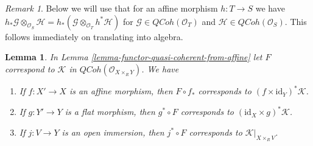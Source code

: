 \documentclass{stacks-project}
\theoremstyle{plain}
\newtheorem{lemma}[subsection]{Lemma}
\theoremstyle{definition}
\theoremstyle{remark}
\newtheorem{remark}[subsection]{Remark}
\numberwithin{equation}{subsection}
\def\QCoh{\mathit{QCoh}}
\begin{document}
\begin{remark}
\label{remark-affine-morphism}
Below we will use that for an affine morphism
$h : T \to S$ we have $h_*\mathcal{G} \otimes_{\mathcal{O}_S} \mathcal{H} =
h_*(\mathcal{G} \otimes_{\mathcal{O}_T} h^*\mathcal{H})$ for
$\mathcal{G} \in \QCoh(\mathcal{O}_T)$ and
$\mathcal{H} \in \QCoh(\mathcal{O}_S)$. This follows
immediately on translating into algebra.
\end{remark}

\begin{lemma}
\label{lemma-functor-quasi-coherent-from-affine-compose}
In Lemma \ref{lemma-functor-quasi-coherent-from-affine} let $F$
correspond to $\mathcal{K}$ in $\QCoh(\mathcal{O}_{X \times_R Y})$.
We have
\begin{enumerate}
\item If $f : X' \to X$ is an affine morphism, then $F \circ f_*$
corresponds to $(f \times \text{id}_Y)^*\mathcal{K}$.
\item If $g : Y' \to Y$ is a flat morphism, then $g^* \circ F$ corresponds to
$(\text{id}_X \times g)^*\mathcal{K}$.
\item If $j : V \to Y$ is an open immersion, then $j^* \circ F$
corresponds to $\mathcal{K}|_{X \times_R V}$.
\end{enumerate}
\end{lemma}
\end{document}
